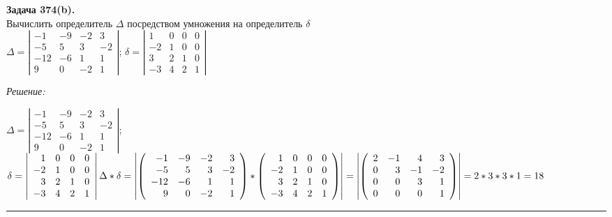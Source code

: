 \documentclass[a4paper, 12pt]{article}
\newenvironment{problem}[2][Задача]
    { \begin{mdframed}[backgroundcolor=gray!10] \textbf{#1 #2.} \\}
    {  \end{mdframed}}
\newenvironment{solution}
    {\textit{Решение: }}
    {\noindent\rule{7in}{1.5pt}}
\begin{document}
\begin{problem}{374(b)}
Вычислить определитель $\Delta$ посредством умножения на определитель $\delta$\\
$\Delta=\left| \begin{array}{rrrr} -1 & -9 & -2 & 3\\ -5 & 5 & 3 & -2\\ -12 & -6 & 1 & 1 \\ 9 & 0 & -2 & 1\end{array}\right|$;
$\delta=\left| \begin{array}{rrrr} 1 & 0 & 0 & 0\\ -2 & 1 & 0 & 0\\ 3 & 2 & 1 & 0 \\ -3 & 4 & 2 & 1\end{array}\right|$
\end{problem}
\begin{solution}

$
\Delta=
\left|
\begin{array}{rrrr}
-1 & -9 & -2 & 3 \\
-5 & 5 & 3 & -2 \\
-12 & -6 & 1 & 1 \\
9 & 0 & -2 & 1
\end{array}
\right|
$;
$
\delta=
\left|
\begin{array}{rrrr}
1 & 0 & 0 & 0 \\
-2 & 1 & 0 & 0 \\
3 & 2 & 1 & 0 \\
-3 & 4 & 2 & 1
\end{array}
\right|
\\
\Delta * \delta = 
\left|
\left(
\begin{array}{rrrr}
-1 & -9 & -2 & 3 \\
-5 & 5 & 3 & -2 \\
-12 & -6 & 1 & 1 \\
9 & 0 & -2 & 1
\end{array}
\right)
*
\left(
\begin{array}{rrrr}
1 & 0 & 0 & 0 \\
-2 & 1 & 0 & 0 \\
3 & 2 & 1 & 0 \\
-3 & 4 & 2 & 1
\end{array}
\right)
\right|
=
\left|
\left(
\begin{array}{rrrr}
2 & -1 & 4 & 3 \\
0 & 3 & -1 & -2 \\
0 & 0 & 3 & 1 \\
0 & 0 & 0 & 1 
\end{array}
\right)
\right|
= 2 * 3 * 3 * 1 = 18
$

\end{solution} 
\end{document}
